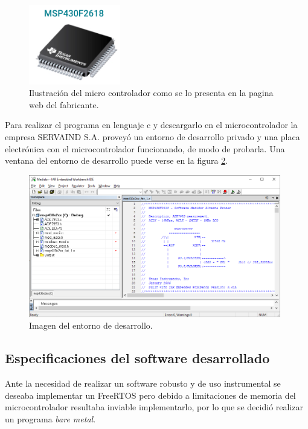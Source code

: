 \begin{figure}[!h]
	\centering
	\includegraphics[width=40mm,keepaspectratio]{Figures/msp430F2618.png}
	\caption{Ilustración del micro controlador como se lo presenta en la pagina web del fabricante.}
	\label{fig:msp430imagen}
\end{figure}

Para realizar el programa en lenguaje c y descargarlo en el microcontrolador la empresa SERVAIND S.A. proveyó un entorno de desarrollo privado y una placa electrónica con el microcontrolador funcionando, de modo de probarla. Una ventana del entorno de desarrollo puede verse en la figura \ref{fig:IARwindow}.

\begin{figure}[h]
	\centering
	\includegraphics[width=110mm,keepaspectratio]{Figures/Embeddedworkbench.png}
	\caption{Imagen del entorno de desarrollo.}
	\label{fig:IARwindow}
\end{figure}



\subsection{Especificaciones del software desarrollado}

Ante la necesidad de realizar un software robusto y de uso instrumental se deseaba implementar un FreeRTOS pero  debido a limitaciones de memoria del microcontrolador resultaba inviable implementarlo, por lo que se decidió realizar un programa \textit{bare metal}.

